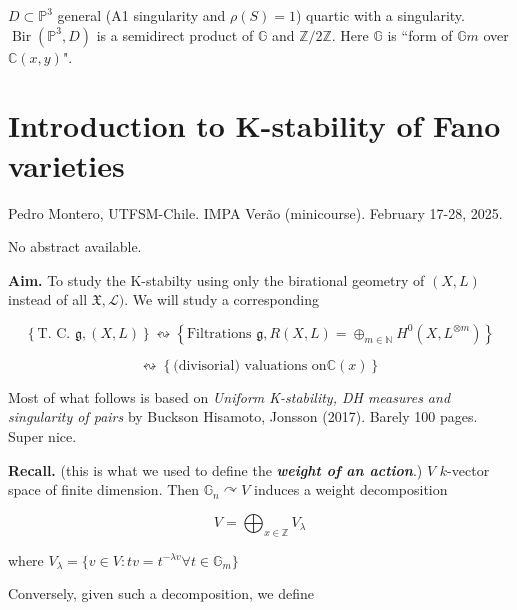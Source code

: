 \begin{theorem}[A-C-M]\leavevmode
$D \subset \mathbb{P}^3$ general (A1
singularity and $\rho(S)=1$) quartic with a
singularity.
$\operatorname{Bir}(\mathbb{P}^3,D)$ is a
semidirect product of $\mathbb{G}$ and
$\mathbb{Z}/2\mathbb{Z}$.
Here $\mathbb{G}$ is ``form of
$\mathbb{G}m$ over $\mathbb{C}(x,y)$".
\end{theorem}


\section{Introduction to K-stability of Fano
varieties}
\label{section-montero-k-stability-fano}

\noindent
Pedro Montero, UTFSM-Chile.
IMPA Verão (minicourse).
February 17-28, 2025.

\medskip\noindent
No abstract available.

\medskip{}

\medskip{}

{\bf Aim.} To study the K-stabilty using only
the birational geometry of $(X,L)$ instead of
all $\mathfrak{X},\mathcal{L})$. We will
study a corresponding

$$
\left\{ \text{T. C. } \mathfrak{g}, (X,L)
\right\} \leftrightsquigarrow \left\{
\text{Filtrations } \mathfrak{g},
R(X,L)=\oplus_{m \in
\mathbb{N}}H^{0}(X,L^{\otimes m}) \right\}
$$

$$
\leftrightsquigarrow \left\{
\text{(divisorial) valuations on
$\mathbb{C}(x)$}  \right\}
$$

\begin{remark}
\label{remark-montero-1}
Most of what follows is based on
\textit{Uniform K-stability, DH measures and
singularity of pairs} by Buckson Hisamoto,
Jonsson (2017). Barely 100 pages. Super nice.
\end{remark}

{\bf Recall.} (this is what we used to define
the \textit{\textbf{weight of an action}}.)
$V$ $k$-vector space of finite dimension.
Then $\mathbb{G}_n \curvearrowright V$
induces a weight decomposition

$$
V = \bigoplus_{x \in \mathbb{Z}}V_\lambda
$$

where $V_\lambda=\{v \in V:tv = t^{-\lambda
v}\forall  t \in \mathbb{G}_m\}$

Conversely, given such a decomposition, we
define

